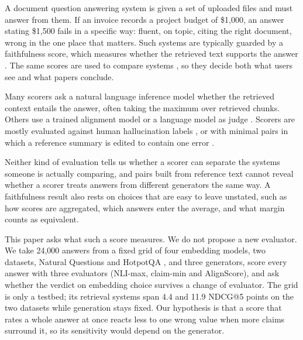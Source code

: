 \documentclass[11pt]{article}
\begin{document}
A document question answering system is given a set of uploaded files and must answer from them. If an invoice records a project budget of \$1,000, an answer stating \$1,500 fails in a specific way: fluent, on topic, citing the right document, wrong in the one place that matters. Such systems are typically guarded by a faithfulness score, which measures whether the retrieved text supports the answer \citep{maynez-etal-2020}. The same scores are used to compare systems \citep{es-etal-2024,tamber-etal-2025}, so they decide both what users see and what papers conclude.
 
Many scorers ask a natural language inference model whether the retrieved context entails the answer, often taking the maximum over retrieved chunks. Others use a trained alignment model \citep[AlignScore;][]{zha-etal-2023} or a language model as judge \citep{saad-falcon-etal-2024,tamber-etal-2025}. Scorers are mostly evaluated against human hallucination labels \citep{honovich-etal-2022,tang-etal-2023,niu-etal-2024,bao-etal-2025}, or with minimal pairs in which a reference summary is edited to contain one error \citep{ma-etal-2023}.
 
Neither kind of evaluation tells us whether a scorer can separate the systems someone is actually comparing, and pairs built from reference text cannot reveal whether a scorer treats answers from different generators the same way. A faithfulness result also rests on choices that are easy to leave unstated, such as how scores are aggregated, which answers enter the average, and what margin counts as equivalent.
 
This paper asks what such a score measures. We do not propose a new evaluator. We take 24,000 answers from a fixed grid of four embedding models, two datasets, Natural Questions \citep{kwiatkowski-etal-2019} and HotpotQA \citep{yang-etal-2018}, and three generators, score every answer with three evaluators (NLI-max, claim-min and AlignScore), and ask whether the verdict on embedding choice survives a change of evaluator. The grid is only a testbed; its retrieval systems span 4.4 and 11.9 NDCG@5 points on the two datasets while generation stays fixed. Our hypothesis is that a score that rates a whole answer at once reacts less to one wrong value when more claims surround it, so its sensitivity would depend on the generator.
 
\end{document}
